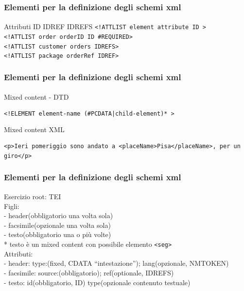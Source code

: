 \begin{frame}
    \frametitle{Elementi per la definizione degli schemi xml}
    \framesubtitle{}
    \addtocounter{nframe}{1}

    \begin{block}{Attributi ID IDREF IDREFS}
     \texttt{<!ATTLIST element attribute ID  >}
    \\\texttt{<!ATTLIST order orderID ID \#REQUIRED>}
    \\\texttt{<!ATTLIST customer orders IDREFS>}
    \\\texttt{<!ATTLIST package orderRef IDREF>}
    \end{block}
\end{frame}

\begin{frame}
    \frametitle{Elementi per la definizione degli schemi xml}
    \framesubtitle{}
    \addtocounter{nframe}{1}

    \begin{block}{Mixed content - DTD}
    \begin{center}\texttt{<!ELEMENT element-name (\#PCDATA|child-element)* >}\end{center}
    \end{block}

    \begin{block}{Mixed content XML}
    \begin{center}\texttt{<p>Ieri pomeriggio sono andato a <placeName>Pisa</placeName>, per un giro</p>}\end{center}
    \end{block}

\end{frame}


\begin{frame}
    \frametitle{Elementi per la definizione degli schemi xml}
    \framesubtitle{}
    \addtocounter{nframe}{1}

    \begin{block}{Esercizio}
        root: TEI
         \\Figli: 
         \\- header(obbligatorio una volta sola) 
         \\- facsimile(opzionale una volta sola) 
         \\- testo(obbligatorio una o più volte)
         \\ * testo è un mixed content con possibile elemento \texttt{<seg>} 
         \\Attributi: 
         \\- header: type:(fixed, CDATA ``intestazione''); lang(opzionale, NMTOKEN)
         \\- facsimile: source:(obbligatorio); ref(optionale, IDREFS)
         \\- testo: id(obbligatorio, ID) type(opzionale contenuto testuale)
    \end{block}
\end{frame}


